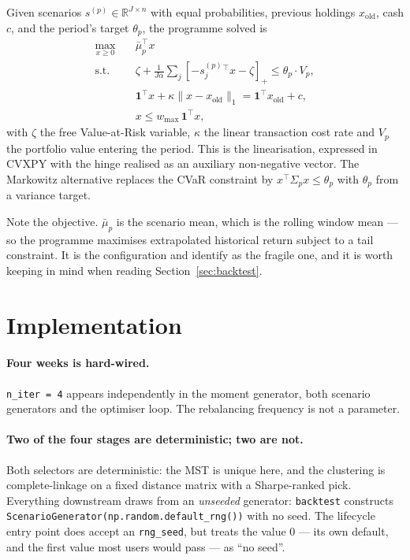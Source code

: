 \documentclass[11pt,a4paper]{article}
\newcommand{\code}[1]{\texttt{#1}}
\begin{document}
Given scenarios $s^{(p)} \in \mathbb{R}^{J \times n}$ with equal probabilities,
previous holdings $x_{\mathrm{old}}$, cash $c$, and the period's target
$\theta_p$, the programme solved is
\begin{equation}
\begin{aligned}
  \max_{x \geq 0} \quad & \bar\mu_p^{\top} x \\
  \text{s.t.} \quad
    & \zeta + \frac{1}{J\alpha} \sum_j \left[ -s^{(p)}_j{}^{\top} x - \zeta \right]_{+}
      \leq \theta_p \cdot V_p, \\
    & \mathbf{1}^{\top} x + \kappa \lVert x - x_{\mathrm{old}} \rVert_1
      = \mathbf{1}^{\top} x_{\mathrm{old}} + c, \\
    & x \leq w_{\max} \, \mathbf{1}^{\top} x,
\end{aligned}
\label{eq:cvar}
\end{equation}
with $\zeta$ the free Value-at-Risk variable, $\kappa$ the linear transaction
cost rate and $V_p$ the portfolio value entering the period. This is the
\citet{rockafellar2000} linearisation, expressed in CVXPY \citep{diamond2016}
with the hinge realised as an auxiliary non-negative vector. The Markowitz
alternative replaces the CVaR constraint by
$x^{\top} \Sigma_p x \leq \theta_p$ with $\theta_p$ from a variance target.

Note the objective. $\bar\mu_p$ is the scenario mean, which is the rolling
window mean --- so the programme maximises extrapolated historical return
subject to a tail constraint. It is the configuration \citet{best1991} and
\citet{schmelzer2013} identify as the fragile one, and it is worth keeping in
mind when reading Section~\ref{sec:backtest}.

\section{Implementation}
\label{sec:impl}

\paragraph{Four weeks is hard-wired.}
\code{n\_iter = 4} appears independently in the moment generator, both scenario
generators and the optimiser loop. The rebalancing frequency is not a
parameter.

\paragraph{Two of the four stages are deterministic; two are not.}
Both selectors are deterministic: the MST is unique here, and the clustering is
complete-linkage on a fixed distance matrix with a Sharpe-ranked pick.
Everything downstream draws from an \emph{unseeded} generator:
\code{backtest} constructs \code{ScenarioGenerator(np.random.default\_rng())}
with no seed. The lifecycle entry point does accept an \code{rng\_seed}, but
treats the value $0$ --- its own default, and the first value most users would
pass --- as ``no seed''.
\end{document}
